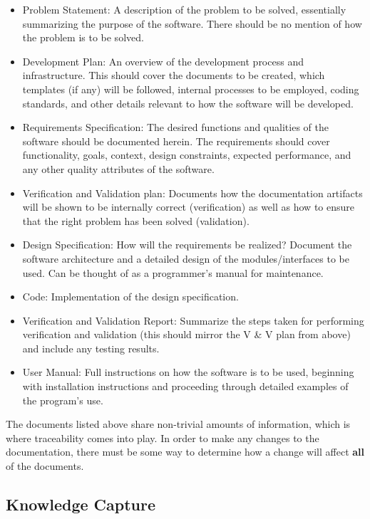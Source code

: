 \documentclass[10pt, preprint]{sigplanconf}
\begin{document}
\begin{itemize}
\item Problem Statement: A description of the problem to be solved, essentially summarizing the purpose of the software. There should be no mention of how the problem is to be solved.
\item Development Plan: An overview of the development process and infrastructure. This should cover the documents to be created, which templates (if any) will be followed, internal processes to be employed, coding standards, and other details relevant to how the software will be developed.
\item Requirements Specification: The desired functions and qualities of the software should be documented herein. The requirements should cover functionality, goals, context, design constraints, expected performance, and any other quality attributes of the software.
\item Verification and Validation plan: Documents how the documentation artifacts will be shown to be internally correct (verification) as well as how to ensure that the right problem has been solved (validation).
\item Design Specification: How will the requirements be realized? Document the software architecture and a detailed design of the modules/interfaces to be used. Can be thought of as a programmer's manual for maintenance.
\item Code: Implementation of the design specification.
\item Verification and Validation Report: Summarize the steps taken for performing verification and validation (this should mirror the V \& V plan from above) and include any testing results.
\item User Manual: Full instructions on how the software is to be used, beginning with installation instructions and proceeding through detailed examples of the program's use.
\end{itemize}

The documents listed above share non-trivial amounts of information, which is where traceability comes into play. In order to make any changes to the documentation, there must be some way to determine how a change will affect \textbf{all} of the documents.

\subsection{Knowledge Capture}
\label{subsec:knowledge}
\end{document}
